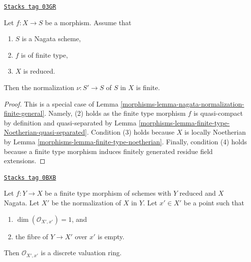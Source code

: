 \begin{lemma}
\label{morphisms-lemma-nagata-normalization-finite}
\href{https://stacks.math.columbia.edu/tag/03GR}{\texttt{Stacks tag 03GR}}

Let $f : X \to S$ be a morphism. Assume that
\begin{enumerate}
\item $S$ is a Nagata scheme,
\item $f$ is of finite type,
\item $X$ is reduced.
\end{enumerate}
Then the normalization $\nu : S' \to S$ of $S$ in $X$ is finite.
\end{lemma}

\begin{proof}

This is a special case of
Lemma \ref{morphisms-lemma-nagata-normalization-finite-general}.
Namely, (2) holds as the finite type morphism $f$ is quasi-compact
by definition and quasi-separated by
Lemma \ref{morphisms-lemma-finite-type-Noetherian-quasi-separated}.
Condition (3) holds because $X$ is locally Noetherian by
Lemma \ref{morphisms-lemma-finite-type-noetherian}. Finally, condition (4)
holds because a finite type morphism induces finitely generated
residue field extensions.
\end{proof}

\begin{lemma}
\label{morphisms-lemma-relative-normalization-normal-codim-1}
\href{https://stacks.math.columbia.edu/tag/0BXB}{\texttt{Stacks tag 0BXB}}

Let $f : Y \to X$ be a finite type morphism of schemes with $Y$ reduced
and $X$ Nagata. Let $X'$ be the normalization of $X$ in $Y$.
Let $x' \in X'$ be a point such that
\begin{enumerate}
\item $\dim(\mathcal{O}_{X', x'}) = 1$, and
\item the fibre of $Y \to X'$ over $x'$ is empty.
\end{enumerate}
Then $\mathcal{O}_{X', x'}$ is a discrete valuation ring.
\end{lemma}

